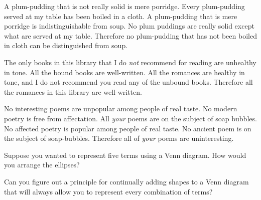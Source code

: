 {\begin{exercises}
\item \label{itm:plum-pudding} A plum-pudding that is not really solid is mere porridge. Every plum-pudding served at my table has been boiled in a cloth. A plum-pudding that is mere porridge is indistinguishable from soup. No plum puddings are really solid except what are served at my table. Therefore no plum-pudding that has not been boiled in cloth can be distinguished from soup. %

\item \label{itm:books} The only books in this library that I do \textit{not} recommend for reading are unhealthy in tone. All the bound books are well-written. All the romances are healthy in tone, and I do not recommend you read any of the unbound books. Therefore all the romances in this library are well-written. 

\item \label{itm: poems} No interesting poems are unpopular among people of real taste. No modern poetry is free from affectation. All \textit{your} poems are on the subject of soap bubbles. No affected poetry is popular among people of real taste. No ancient poem is on the subject of soap-bubbles. Therefore all of \textit{your} poems are uninteresting. %

\end{exercises}
                                    
\noindent\problempart
\begin{exercises}
\item Suppose you wanted to represent five terms using a Venn diagram. How would you arrange the ellipses? 
\item Can you figure out a principle for continually adding shapes to a Venn diagram that will always allow you to represent every combination of terms?
\end{exercises}

%

}{}


